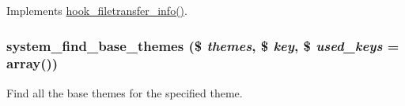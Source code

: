 \label{system_8module_a56c90d331efe545cec21cc4cc9cede5f}
Implements \hyperlink{group__hooks_gacecdedb61704444382417e6ec8da240d}{hook\_\-filetransfer\_\-info()}. \hypertarget{system_8module_a0cd2b51f55ab9299f139f9916bf7a7c0}{
\subsubsection[{system\_\-find\_\-base\_\-themes}]{\setlength{\rightskip}{0pt plus 5cm}system\_\-find\_\-base\_\-themes (\$ {\em themes}, \/  \$ {\em key}, \/  \$ {\em used\_\-keys} = {\ttfamily array()})}}
\label{system_8module_a0cd2b51f55ab9299f139f9916bf7a7c0}
Find all the base themes for the specified theme.


